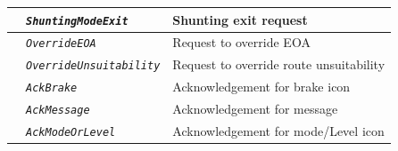 \documentclass{template/openetcs}
\begin{document}
\begin{itemize}
\begin{longtable}{|l|l|l|}
			\hline
			
			&	\begin{minipage}[t]{0.40\linewidth} \emph{\texttt{ShuntingModeExit}} \end{minipage}
			&	\begin{minipage}[t]{0.38\linewidth}Shunting exit request \end{minipage} \\
			
			\hline
			
			&	\begin{minipage}[t]{0.40\linewidth} \emph{\texttt{OverrideEOA}} \end{minipage}
			&	\begin{minipage}[t]{0.38\linewidth} Request to override EOA \end{minipage} \\
			
			\hline
			
			&	\begin{minipage}[t]{0.40\linewidth} \emph{\texttt{OverrideUnsuitability}} \end{minipage}
			&	\begin{minipage}[t]{0.38\linewidth} Request to override route unsuitability \end{minipage} \\
			
			\hline
			
			&	\begin{minipage}[t]{0.40\linewidth} \emph{\texttt{AckBrake}} \end{minipage}
			&	\begin{minipage}[t]{0.38\linewidth} Acknowledgement for brake icon \end{minipage} \\
			
			\hline
			
			&	\begin{minipage}[t]{0.40\linewidth} \emph{\texttt{AckMessage}} \end{minipage}
			&	\begin{minipage}[t]{0.38\linewidth} Acknowledgement for message \end{minipage} \\
			
			\hline
			
			&	\begin{minipage}[t]{0.40\linewidth} \emph{\texttt{AckModeOrLevel}} \end{minipage}
			&	\begin{minipage}[t]{0.38\linewidth} Acknowledgement for mode/Level icon \end{minipage} \\
			

\end{longtable}
\end{itemize}
\end{document}

